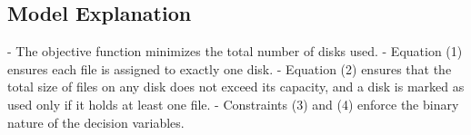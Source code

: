 \documentclass{article}
\begin{document}
\subsection*{Model Explanation}
- The objective function minimizes the total number of disks used.
- Equation (1) ensures each file is assigned to exactly one disk.
- Equation (2) ensures that the total size of files on any disk does not exceed its capacity, and a disk is marked as used only if it holds at least one file.
- Constraints (3) and (4) enforce the binary nature of the decision variables.
\end{document}
